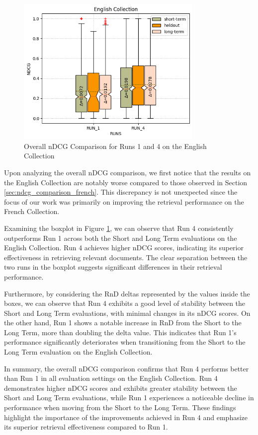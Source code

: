 \begin{figure}[!h]
\centering
\includegraphics[width=0.8\textwidth]{figure/StatisticalAnalysis/BoxPlot/NDGC ENGLISH.png}
\caption{Overall nDCG Comparison for Runs 1 and 4 on the English Collection}
\label{fig:overall_ndcg_eng}
\end{figure}
 
Upon analyzing the overall \ac{nDCG} comparison, we first notice that the results on the English Collection are notably worse compared to those observed in Section \ref{sec:ndcg_comparison_french}. 
This discrepancy is not unexpected since the focus of our work was primarily on improving the retrieval performance on the French Collection.

Examining the boxplot in Figure \ref{fig:overall_ndcg_eng}, we can observe that Run 4 consistently outperforms Run 1 across both the Short and Long Term evaluations on the English Collection. 
Run 4 achieves higher \ac{nDCG} scores, indicating its superior effectiveness in retrieving relevant documents. 
The clear separation between the two runs in the boxplot suggests significant differences in their retrieval performance.

Furthermore, by considering the \ac{RnD} deltas represented by the values inside the boxes, we can observe that Run 4 exhibits a good level of stability between the Short and Long Term evaluations, with minimal changes in its \ac{nDCG} scores. 
On the other hand, Run 1 shows a notable increase in \ac{RnD} from the Short to the Long Term, more than doubling the delta value. 
This indicates that Run 1's performance significantly deteriorates when transitioning from the Short to the Long Term evaluation on the English Collection.

In summary, the overall \ac{nDCG} comparison confirms that Run 4 performs better than Run 1 in all evaluation settings on the English Collection. 
Run 4 demonstrates higher \ac{nDCG} scores and exhibits greater stability between the Short and Long Term evaluations, while Run 1 experiences a noticeable decline in performance when moving from the Short to the Long Term. 
These findings highlight the importance of the improvements achieved in Run 4 and emphasize its superior retrieval effectiveness compared to Run 1.

